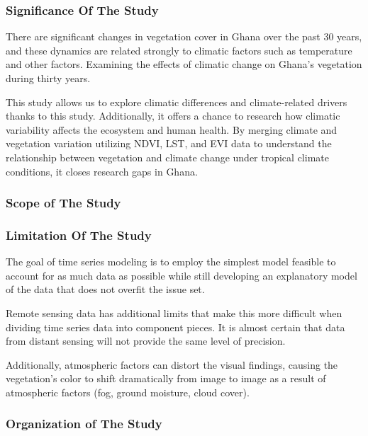 \documentclass[
  letterpaper,
  DIV=11,
  numbers=noendperiod]{scrartcl}
\begin{document}
\hypertarget{significance-of-the-study}{%
\subsubsection{Significance Of The
Study}\label{significance-of-the-study}}

There are significant changes in vegetation cover in Ghana over the past
30 years, and these dynamics are related strongly to climatic factors
such as temperature and other factors. Examining the effects of climatic
change on Ghana's vegetation during thirty years.

This study allows us to explore climatic differences and climate-related
drivers thanks to this study. Additionally, it offers a chance to
research how climatic variability affects the ecosystem and human
health. By merging climate and vegetation variation utilizing NDVI, LST,
and EVI data to understand the relationship between vegetation and
climate change under tropical climate conditions, it closes research
gaps in Ghana.

\hypertarget{scope-of-the-study}{%
\subsubsection{Scope of The Study}\label{scope-of-the-study}}

\hypertarget{limitation-of-the-study}{%
\subsubsection{Limitation Of The Study}\label{limitation-of-the-study}}

The goal of time series modeling is to employ the simplest model
feasible to account for as much data as possible while still developing
an explanatory model of the data that does not overfit the issue set.

Remote sensing data has additional limits that make this more difficult
when dividing time series data into component pieces. It is almost
certain that data from distant sensing will not provide the same level
of precision.

Additionally, atmospheric factors can distort the visual findings,
causing the vegetation's color to shift dramatically from image to image
as a result of atmospheric factors (fog, ground moisture, cloud cover).

\hypertarget{organization-of-the-study}{%
\subsubsection{Organization of The
Study}\label{organization-of-the-study}}
\end{document}
